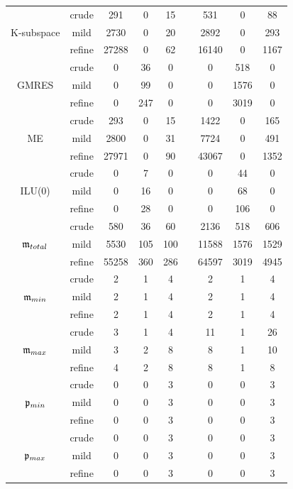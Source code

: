 \begin{table}[h]
\begin{adjustbox}{width=0.8\columnwidth,center}
\begin{tabular}{ ccccccccc }
		\hline
		& crude & 291 & 0 & 15  & & 531 & 0 & 88 \\
		K-subspace  & mild & 2730 & 0 & 20  & & 2892 & 0 & 293 \\
		& refine & 27288 & 0 & 62  & & 16140 & 0 & 1167 \\
		\hline
		& crude & 0 & 36 & 0 &  & 0 & 518 & 0 \\
		GMRES  & mild & 0 & 99 & 0 &  & 0 & 1576 & 0 \\
		& refine & 0 & 247 & 0 & &  0 & 3019 & 0 \\
		\hline
		& crude & 293 & 0 & 15  & & 1422 & 0 & 165 \\
		ME  & mild & 2800 & 0 & 31 &  & 7724 & 0 & 491 \\
		& refine & 27971 & 0 & 90  & & 43067 & 0 & 1352 \\
		\hline
		& crude & 0 & 7 & 0  & & 0 & 44 & 0 \\
		ILU(0)  & mild & 0 & 16 & 0  & & 0 & 68 & 0 \\
		& refine & 0 & 28 & 0  & & 0 & 106 & 0  \\
		\hline
		& crude & 580 & 36 & 60  & & 2136 & 518 & 606 \\
		$\mathfrak{m}_{total}$  & mild & 5530 & 105 & 100 &  & 11588 & 1576 & 1529 \\
		& refine & 55258 & 360 & 286  & & 64597 & 3019 & 4945 \\
		\hline
		& crude & 2 & 1 & 4  & & 2 & 1 & 4 \\
		$\mathfrak{m}_{min}$  & mild & 2 & 1 & 4  & & 2 & 1 & 4 \\
		& refine & 2 & 1 & 4 & &  2 & 1 & 4 \\
		\hline
		& crude & 3 & 1 & 4 & &  11 & 1 & 26 \\
		$\mathfrak{m}_{max}$  & mild & 3 & 2 & 8  & & 8 & 1 & 10  \\
		& refine & 4 & 2 & 8  & & 8 & 1 & 8 \\
		\hline
		& crude & 0 & 0 & 3  & & 0 & 0 & 3 \\
		$\mathfrak{p}_{min}$  & mild & 0 & 0 & 3  & & 0 & 0 & 3 \\
		& refine & 0 & 0 & 3  & & 0 & 0 & 3 \\
		\hline
		& crude & 0 & 0 & 3 &  & 0 & 0 & 3 \\
		$\mathfrak{p}_{max}$  & mild & 0 & 0 & 3  & & 0 & 0 & 3  \\
		& refine & 0 & 0 & 3 &  & 0 & 0 & 3 \\
		\hline
	\end{tabular}
	\end{adjustbox}
\end{table}


